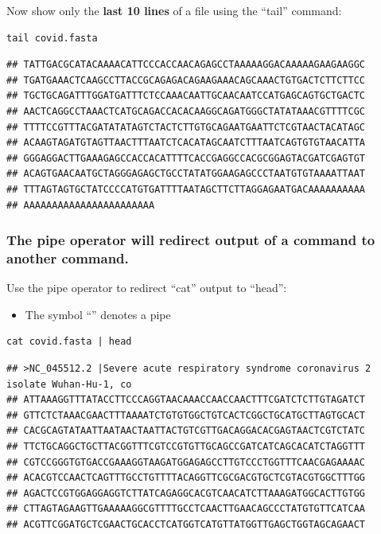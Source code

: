 \documentclass[
]{book}
\providecommand{\tightlist}{%
  \setlength{\itemsep}{0pt}\setlength{\parskip}{0pt}}
\begin{document}
Now show only the \textbf{last 10 lines} of a file using the ``tail'' command:

\begin{verbatim}
tail covid.fasta
\end{verbatim}

\begin{verbatim}
## TATTGACGCATACAAAACATTCCCACCAACAGAGCCTAAAAAGGACAAAAAGAAGAAGGC
## TGATGAAACTCAAGCCTTACCGCAGAGACAGAAGAAACAGCAAACTGTGACTCTTCTTCC
## TGCTGCAGATTTGGATGATTTCTCCAAACAATTGCAACAATCCATGAGCAGTGCTGACTC
## AACTCAGGCCTAAACTCATGCAGACCACACAAGGCAGATGGGCTATATAAACGTTTTCGC
## TTTTCCGTTTACGATATATAGTCTACTCTTGTGCAGAATGAATTCTCGTAACTACATAGC
## ACAAGTAGATGTAGTTAACTTTAATCTCACATAGCAATCTTTAATCAGTGTGTAACATTA
## GGGAGGACTTGAAAGAGCCACCACATTTTCACCGAGGCCACGCGGAGTACGATCGAGTGT
## ACAGTGAACAATGCTAGGGAGAGCTGCCTATATGGAAGAGCCCTAATGTGTAAAATTAAT
## TTTAGTAGTGCTATCCCCATGTGATTTTAATAGCTTCTTAGGAGAATGACAAAAAAAAAA
## AAAAAAAAAAAAAAAAAAAAAAA
\end{verbatim}

\hypertarget{the-pipe-operator-will-redirect-output-of-a-command-to-another-command.}{%
\subsubsection*{The pipe operator will redirect output of a command to another command.}\label{the-pipe-operator-will-redirect-output-of-a-command-to-another-command.}}

Use the pipe operator to redirect ``cat'' output to ``head'':

\begin{itemize}
\tightlist
\item
  The symbol ``\textbar{}'' denotes a pipe
\end{itemize}

\begin{verbatim}
cat covid.fasta | head
\end{verbatim}

\begin{verbatim}
## >NC_045512.2 |Severe acute respiratory syndrome coronavirus 2 isolate Wuhan-Hu-1, co
## ATTAAAGGTTTATACCTTCCCAGGTAACAAACCAACCAACTTTCGATCTCTTGTAGATCT
## GTTCTCTAAACGAACTTTAAAATCTGTGTGGCTGTCACTCGGCTGCATGCTTAGTGCACT
## CACGCAGTATAATTAATAACTAATTACTGTCGTTGACAGGACACGAGTAACTCGTCTATC
## TTCTGCAGGCTGCTTACGGTTTCGTCCGTGTTGCAGCCGATCATCAGCACATCTAGGTTT
## CGTCCGGGTGTGACCGAAAGGTAAGATGGAGAGCCTTGTCCCTGGTTTCAACGAGAAAAC
## ACACGTCCAACTCAGTTTGCCTGTTTTACAGGTTCGCGACGTGCTCGTACGTGGCTTTGG
## AGACTCCGTGGAGGAGGTCTTATCAGAGGCACGTCAACATCTTAAAGATGGCACTTGTGG
## CTTAGTAGAAGTTGAAAAAGGCGTTTTGCCTCAACTTGAACAGCCCTATGTGTTCATCAA
## ACGTTCGGATGCTCGAACTGCACCTCATGGTCATGTTATGGTTGAGCTGGTAGCAGAACT
\end{verbatim}
\end{document}
